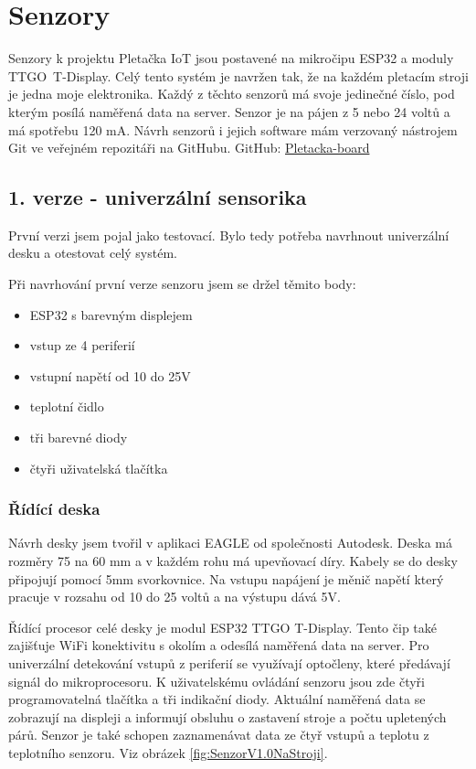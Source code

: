 \chapter{Senzory}

Senzory k projektu Pletačka IoT jsou postavené na mikročipu ESP32 a moduly TTGO~T-Display.
Celý tento systém je navržen tak, že na každém pletacím stroji je jedna moje elektronika.
Každý z těchto senzorů má svoje jedinečné číslo, pod kterým posílá naměřená data na server.
Senzor je na pájen z 5 nebo 24 voltů a má spotřebu 120 mA.
Návrh senzorů i jejich software mám verzovaný nástrojem Git ve veřejném repozitáři na GitHubu.\newline
GitHub: \href{https://github.com/Pletacka-IoT/Pletacka-board}{Pletacka-board}\cite{PL_BOARD}

\section{1. verze - univerzální sensorika}

První verzi jsem pojal jako testovací. Bylo tedy potřeba navrhnout univerzální desku a otestovat celý systém.\newline

Při navrhování první verze senzoru jsem se držel těmito body:
\begin{itemize}
    \item ESP32 s barevným displejem
    \item vstup ze 4 periferií
    \item vstupní napětí od 10 do 25V
    \item teplotní čidlo
    \item tři barevné diody
    \item čtyři uživatelská tlačítka
\end{itemize}


\subsection{Řídící deska}
Návrh desky jsem tvořil v aplikaci EAGLE od společnosti Autodesk. 
Deska má rozměry 75 na 60 mm a v každém rohu má upevňovací díry. 
Kabely se do desky připojují pomocí 5mm svorkovnice.
Na vstupu napájení je měnič napětí který pracuje v rozsahu od 10 do 25 voltů a na výstupu dává 5V. 

Řídící procesor celé desky je modul ESP32 TTGO T-Display.
Tento čip také zajišťuje WiFi konektivitu s okolím a odesílá naměřená data na server.
Pro univerzální detekování vstupů z periferií se využívají optočleny, které předávají signál do mikroprocesoru.
K uživatelskému ovládání senzoru jsou zde čtyři programovatelná tlačítka a tři indikační diody.
Aktuální naměřená data se zobrazují na displeji a informují obsluhu o zastavení stroje a počtu upletených párů.
Senzor je také schopen zaznamenávat data ze čtyř vstupů a teplotu z teplotního senzoru. Viz obrázek \ref{fig:SenzorV1.0NaStroji}.

